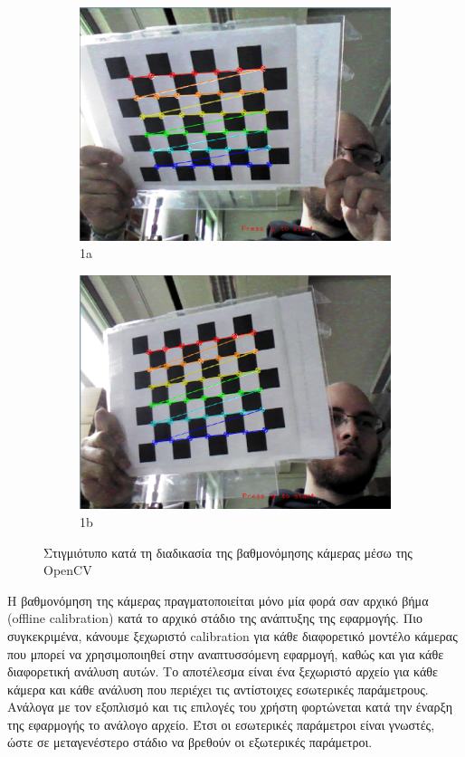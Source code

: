\begin{figure}[H]
\begin{subfigure}{.5\textwidth}
  \centering
  \includegraphics[width=.8\linewidth]{Files/Figures/calibration.pdf}
  \caption{1a}
  \label{fig:calibration_screenshot1}
\end{subfigure}%
\begin{subfigure}{.5\textwidth}
  \centering
  \includegraphics[width=.8\linewidth]{Files/Figures/calib2.pdf}
  \caption{1b}
  \label{fig:calibration_screenshot2}
\end{subfigure}
\caption[Στιγμιότυπο κατά τη διαδικασία της βαθμονόμησης κάμερας μέσω της OpenCV]{Στιγμιότυπο κατά τη διαδικασία της βαθμονόμησης κάμερας μέσω της OpenCV}
\label{fig:calibration_screenshot}
\end{figure}



Η βαθμονόμηση της κάμερας πραγματοποιείται μόνο μία φορά σαν αρχικό βήμα (offline calibration) κατά το αρχικό στάδιο της ανάπτυξης της εφαρμογής. Πιο συγκεκριμένα, κάνουμε ξεχωριστό calibration για κάθε διαφορετικό μοντέλο κάμερας που μπορεί να χρησιμοποιηθεί στην αναπτυσσόμενη εφαρμογή, καθώς και για κάθε διαφορετική ανάλυση αυτών. Το αποτέλεσμα είναι ένα ξεχωριστό αρχείο για κάθε κάμερα και κάθε ανάλυση που περιέχει τις αντίστοιχες εσωτερικές παράμετρους. Ανάλογα με τον εξοπλισμό και τις επιλογές του χρήστη φορτώνεται κατά την έναρξη της εφαρμογής το ανάλογο αρχείο. Έτσι οι εσωτερικές παράμετροι είναι γνωστές, ώστε σε μεταγενέστερο στάδιο να βρεθούν οι εξωτερικές παράμετροι.



